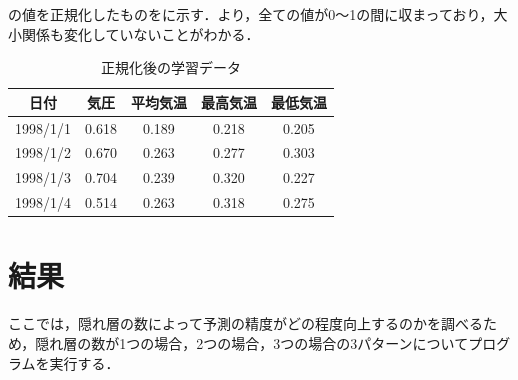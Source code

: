 \documentclass{eithesis}
\begin{document}
    の値を正規化したものをに示す．より，全ての値が0〜1の間に収まっており，大小関係も変化していないことがわかる．
    \begin{table}[htbp]
      \centering
      \caption{正規化後の学習データ}
      \label{tab_sample_norm}
      \begin{tabular}[htbp]{c|c|c|c|c}
        日付 & 気圧 & 平均気温 & 最高気温 & 最低気温 \\ \hline
        1998/1/1 & 0.618 & 0.189 & 0.218 & 0.205 \\
        1998/1/2 & 0.670 & 0.263 & 0.277 & 0.303 \\
        1998/1/3 & 0.704 & 0.239 & 0.320 & 0.227 \\
        1998/1/4 & 0.514 & 0.263 & 0.318 & 0.275 \\
      \end{tabular}
    \end{table}

\chapter{結果}
  ここでは，隠れ層の数によって予測の精度がどの程度向上するのかを調べるため，隠れ層の数が1つの場合，2つの場合，3つの場合の3パターンについてプログラムを実行する．
\end{document}
